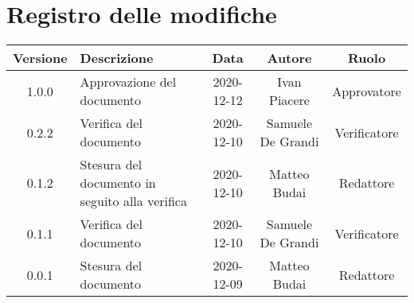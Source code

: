 \section*{Registro delle modifiche}

\begin{center}
	\begin{longtable}{|c|p{5cm}|c|c|c|}
	\hline
	\rowcolor{lighter-grayer}
	\textbf{Versione} & \textbf{Descrizione} & \textbf{Data} & \textbf{Autore} & \textbf{Ruolo} \\
	\hline
	\endfirsthead


	\hline
	1.0.0 & Approvazione del documento & 2020-12-12 & Ivan Piacere & Approvatore \\
	\hline
	0.2.2 & Verifica del documento & 2020-12-10 & Samuele De Grandi & Verificatore \\
	\hline
    0.1.2 & Stesura del documento in seguito alla verifica & 2020-12-10 & Matteo Budai & Redattore \\
    \hline
    0.1.1 & Verifica del documento & 2020-12-10 & Samuele De Grandi & Verificatore \\
    \hline
    0.0.1 & Stesura del documento & 2020-12-09 & Matteo Budai & Redattore \\
    \hline
	\end{longtable}
\end{center}